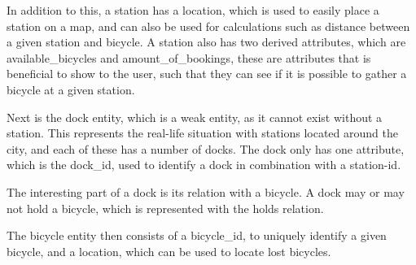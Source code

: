 In addition to this, a station has a location, which is used to easily place a station on a map, and can also be used for calculations such as distance between a given station and bicycle.
A station also has two derived attributes, which are available_bicycles and amount_of_bookings, these are attributes that is beneficial to show to the user, such that they can see if it is possible to gather a bicycle at a given station.

Next is the dock entity, which is a weak entity, as it cannot exist without a station.
This represents the real-life situation with stations located around the city, and each of these has a number of docks.
The dock only has one attribute, which is the dock_id, used to identify a dock in combination with a station-id.

The interesting part of a dock is its relation with a bicycle.
A dock may or may not hold a bicycle, which is represented with the holds relation.

The bicycle entity then consists of a bicycle_id, to uniquely identify a given bicycle, and a location, which can be used to locate lost bicycles.